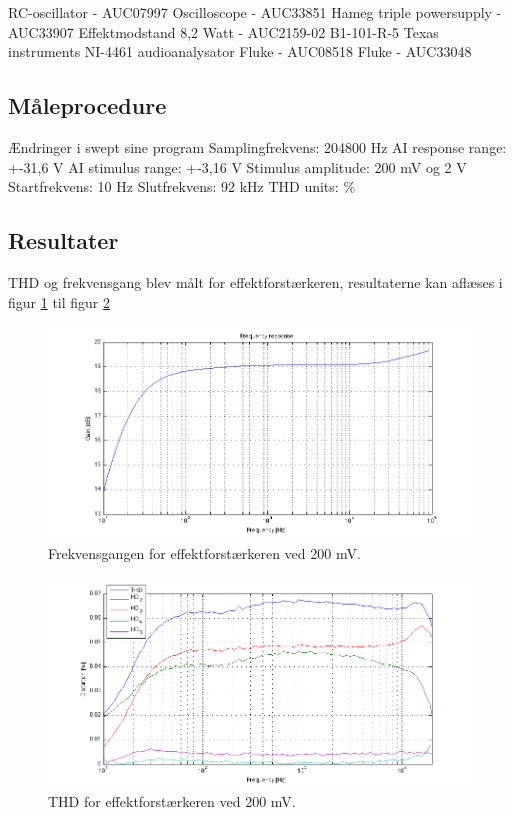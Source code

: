 RC-oscillator - AUC07997
Oscilloscope - AUC33851
Hameg triple powersupply - AUC33907
Effektmodstand 8,2  Watt - AUC2159-02 B1-101-R-5
Texas instruments NI-4461 audioanalysator
Fluke - AUC08518
Fluke - AUC33048

\subsection*{Måleprocedure}

Ændringer i swept sine program
Samplingfrekvens: 204800 Hz
AI response range: +-31,6 V
AI stimulus range: +-3,16 V
Stimulus amplitude: 200 mV og 2 V
Startfrekvens: 10 Hz
Slutfrekvens: 92 kHz
THD units: \%

\subsection*{Resultater}
THD og frekvensgang blev målt for effektforstærkeren, resultaterne kan aflæses i figur \ref{fig:apeff:frek200mv} til figur \ref{fig:apeff:thd200mv} 

\begin{figure}[h]
\centering
\includegraphics[width=\textwidth]{maalerapporter/effektforstaerker/200mV-45mA-uden-modstand frek.png}
\caption{Frekvensgangen for effektforstærkeren ved 200 mV.}
\label{fig:apeff:frek200mv}
\end{figure}

\begin{figure}[h]
\centering
\includegraphics[width=\textwidth]{maalerapporter/effektforstaerker/200mV-45mA-uden-modstand thd.png}
\caption{THD for effektforstærkeren ved 200 mV.}
\label{fig:apeff:thd200mv}
\end{figure}

